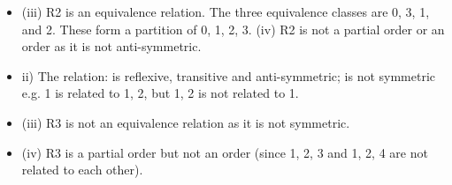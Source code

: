 \documentclass[]{report}
\begin{document}
\begin{itemize}
    \item (iii) R2 is an equivalence relation. The three equivalence classes are
{0, 3}, {1}, and {2}. These form a partition of {0, 1, 2, 3}.
(iv) R2 is not a partial order or an order as it is not anti-symmetric.


\item ii) The relation:
is reflexive, transitive and anti-symmetric;
is not symmetric e.g. {1} is related to {1, 2}, but {1, 2} is not
related to {1}.

\item (iii) R3 is not an equivalence relation as it is not symmetric.

\item (iv) R3 is a partial order but not an order (since {1, 2, 3} and {1, 2, 4}
are not related to each other).
\end{itemize}	


	


\end{document}
